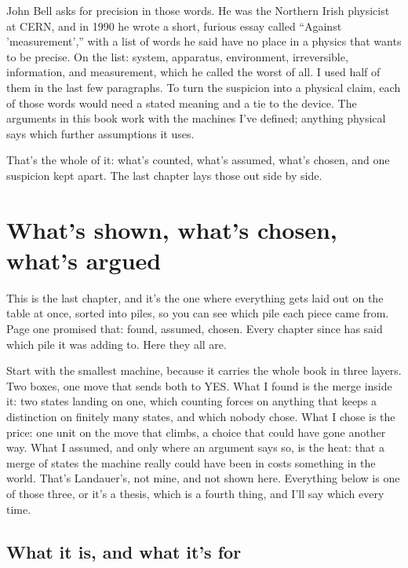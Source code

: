 \documentclass[11pt,twoside]{article}
\theoremstyle{thielethm}
\theoremstyle{thieledef}
\theoremstyle{thieledef}
\theoremstyle{thieledef}
\theoremstyle{thielethm}
\theoremstyle{thieleobs}
\theoremstyle{thielethm}
\begin{document}
John Bell asks for precision in those words. He was the Northern Irish physicist at CERN, and in 1990 he wrote a short, furious essay called ``Against 'measurement','' with a list of words he said have no place in a physics that wants to be precise. On the list: system, apparatus, environment, irreversible, information, and measurement, which he called the worst of all. I used half of them in the last few paragraphs. To turn the suspicion into a physical claim, each of those words would need a stated meaning and a tie to the device. The arguments in this book work with the machines I've defined; anything physical says which further assumptions it uses.

That's the whole of it: what's counted, what's assumed, what's chosen, and one suspicion kept apart. The last chapter lays those out side by side.

\section{What's shown, what's chosen, what's argued}
\label{sec:shown-chosen}

This is the last chapter, and it's the one where everything gets laid out on the table at once, sorted into piles, so you can see which pile each piece came from. Page one promised that: found, assumed, chosen. Every chapter since has said which pile it was adding to. Here they all are.

Start with the smallest machine, because it carries the whole book in three layers. Two boxes, one move that sends both to YES. What I found is the merge inside it: two states landing on one, which counting forces on anything that keeps a distinction on finitely many states, and which nobody chose. What I chose is the price: one unit on the move that climbs, a choice that could have gone another way. What I assumed, and only where an argument says so, is the heat: that a merge of states the machine really could have been in costs something in the world. That's Landauer's, not mine, and not shown here. Everything below is one of those three, or it's a thesis, which is a fourth thing, and I'll say which every time.

\subsection{What it is, and what it's for}
\end{document}

